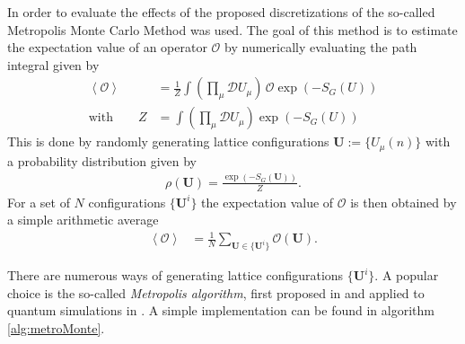 In order to evaluate the effects of the proposed discretizations of \SUTwo the so-called Metropolis Monte Carlo Method was used. The goal of this method is to estimate the expectation value of an operator $\mathcal{O}$ by numerically evaluating the path integral given by
\begin{align*}
 \left\langle \mathcal{O} \right\rangle & = \frac{1}{Z}\int \left( \prod_\mu \mathcal{D} U_\mu \right) \, \mathcal{O} \exp \left( - S_G(U)\right) \\
 \textrm{with} \qquad Z                 & = \int \left( \prod_\mu \mathcal{D} U_\mu \right) \exp \left( - S_G(U)\right)
\end{align*}
This is done by randomly generating lattice configurations $\boldsymbol{U} := \{ U_\mu(n) \}$ with a probability distribution given by
\begin{align}
 \rho ( \boldsymbol{U} ) = \frac{\exp\left(  -S_G(\boldsymbol{U}) \right)}{Z} \textrm{.}
 \label{eq:metroDist}
\end{align}
For a set of $N$ configurations $\{ \boldsymbol{U}^i \}$ the expectation value of $\mathcal{O}$ is then obtained by a simple arithmetic average
\begin{align*}
 \left\langle \mathcal{O} \right\rangle & = \frac{1}{N} \sum_{\boldsymbol{U} \in \{ \boldsymbol{U}^i \}} \mathcal{O} (\boldsymbol{U}) \textrm{.}
\end{align*}

There are numerous ways of generating lattice configurations $\{ \boldsymbol{U}^i \}$. A popular choice is the so-called \emph{Metropolis algorithm}, first proposed in \cite{metropolis:1953} and applied to quantum simulations in \cite{Creutz:1981}. A simple implementation can be found in algorithm \ref{alg:metroMonte}.


